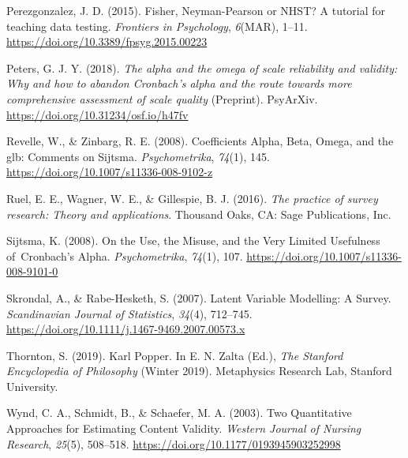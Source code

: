 \documentclass[
  english,
  man]{apa6}
\begin{document}
\leavevmode\hypertarget{ref-Perezgonzalez2015}{}%
Perezgonzalez, J. D. (2015). Fisher, Neyman-Pearson or NHST? A tutorial for teaching data testing. \emph{Frontiers in Psychology}, \emph{6}(MAR), 1--11. \url{https://doi.org/10.3389/fpsyg.2015.00223}

\leavevmode\hypertarget{ref-petersAlphaOmegaScale2018}{}%
Peters, G. J. Y. (2018). \emph{The alpha and the omega of scale reliability and validity: Why and how to abandon Cronbach's alpha and the route towards more comprehensive assessment of scale quality} (Preprint). PsyArXiv. \url{https://doi.org/10.31234/osf.io/h47fv}

\leavevmode\hypertarget{ref-revelleCoefficientsAlphaBeta2008}{}%
Revelle, W., \& Zinbarg, R. E. (2008). Coefficients Alpha, Beta, Omega, and the glb: Comments on Sijtsma. \emph{Psychometrika}, \emph{74}(1), 145. \url{https://doi.org/10.1007/s11336-008-9102-z}

\leavevmode\hypertarget{ref-ruelPracticeSurveyResearch2016}{}%
Ruel, E. E., Wagner, W. E., \& Gillespie, B. J. (2016). \emph{The practice of survey research: Theory and applications}. Thousand Oaks, CA: Sage Publications, Inc.

\leavevmode\hypertarget{ref-sijtsmaUseMisuseVery2008}{}%
Sijtsma, K. (2008). On the Use, the Misuse, and the Very Limited Usefulness of~Cronbach's Alpha. \emph{Psychometrika}, \emph{74}(1), 107. \url{https://doi.org/10.1007/s11336-008-9101-0}

\leavevmode\hypertarget{ref-skrondalLatentVariableModelling2007}{}%
Skrondal, A., \& Rabe-Hesketh, S. (2007). Latent Variable Modelling: A Survey. \emph{Scandinavian Journal of Statistics}, \emph{34}(4), 712--745. \url{https://doi.org/10.1111/j.1467-9469.2007.00573.x}

\leavevmode\hypertarget{ref-thorntonKarlPopper2019}{}%
Thornton, S. (2019). Karl Popper. In E. N. Zalta (Ed.), \emph{The Stanford Encyclopedia of Philosophy} (Winter 2019). Metaphysics Research Lab, Stanford University.

\leavevmode\hypertarget{ref-wyndTwoQuantitativeApproaches2003}{}%
Wynd, C. A., Schmidt, B., \& Schaefer, M. A. (2003). Two Quantitative Approaches for Estimating Content Validity. \emph{Western Journal of Nursing Research}, \emph{25}(5), 508--518. \url{https://doi.org/10.1177/0193945903252998}

\endgroup

\clearpage
\renewcommand{\listfigurename}{Figure captions}
\end{document}
